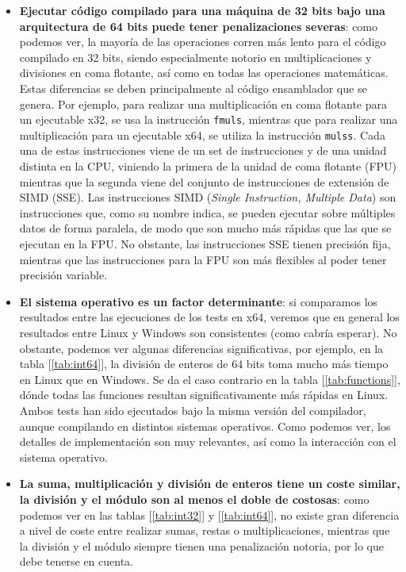 \begin{itemize}
	\item \textbf{Ejecutar código compilado para una máquina de 32 bits bajo una arquitectura de 64 bits puede tener penalizaciones severas}: como podemos ver, la mayoría de las operaciones corren más lento para el código compilado en 32 bits, siendo especialmente notorio en multiplicaciones y divisiones en coma flotante, así como en todas las operaciones matemáticas. Estas diferencias se deben principalmente al código ensamblador que se genera. Por ejemplo, para realizar una multiplicación en coma flotante para un ejecutable x32, se usa la instrucción \lstinline{fmuls}, mientras que para realizar una multiplicación para un ejecutable x64, se utiliza la instrucción \lstinline{mulss}. Cada una de estas instrucciones viene de un set de instrucciones y de una unidad distinta en la CPU, viniendo la primera de la unidad de coma flotante (FPU) mientras que la segunda viene del conjunto de instrucciones de extensión de SIMD (SSE). Las instrucciones SIMD (\emph{Single Instruction, Multiple Data}) son instrucciones que, como su nombre indica, se pueden ejecutar sobre múltiples datos de forma paralela, de modo que son mucho más rápidas que las que se ejecutan en la FPU. No obstante, las instrucciones SSE tienen precisión fija, mientras que las instrucciones para la FPU son más flexibles al poder tener precisión variable.
	\item \textbf{El sistema operativo es un factor determinante}: si comparamos los resultados entre las ejecuciones de los tests en x64, veremos que en general los resultados entre Linux y Windows son consistentes (como cabría esperar). No obstante, podemos ver algunas diferencias significativas, por ejemplo, en la tabla [\ref{tab:int64}], la división de enteros de 64 bits toma mucho más tiempo en Linux que en Windows. Se da el caso contrario en la tabla [\ref{tab:functions}], dónde todas las funciones resultan significativamente más rápidas en Linux. Ambos tests han sido ejecutados bajo la misma versión del compilador, aunque compilando en distintos sistemas operativos. Como podemos ver, los detalles de implementación son muy relevantes, así como la interacción con el sistema operativo.
	\item \textbf{La suma, multiplicación y división de enteros tiene un coste similar, la división y el módulo son al menos el doble de costosas}: como podemos ver en las tablas [\ref{tab:int32}] y [\ref{tab:int64}], no existe gran diferencia a nivel de coste entre realizar sumas, restas o multiplicaciones, mientras que la división y el módulo siempre tienen una penalización notoria, por lo que debe tenerse en cuenta.

\end{itemize}

